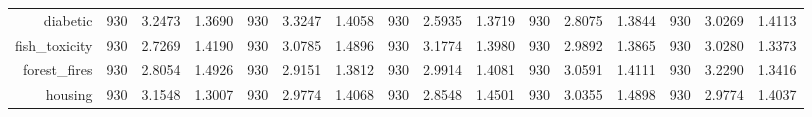 \begin{table}[htbp]
{\begin{tabular}{rccccccccccccccc}
			diabetic                            & 930                                 & 3.2473                                                                    & 1.3690          & 930                            & 3.3247                                                                             & 1.4058          & 930                             & \cellcolor[rgb]{ .776,  .937,  .808}\textcolor[rgb]{ 0,  .38,  0}{2.5935} & 1.3719          & 930                             & 2.8075                                                                    & 1.3844          & 930                             & 3.0269          & 1.4113          \\
			fish\_toxicity                      & 930                                 & \cellcolor[rgb]{ .776,  .937,  .808}\textcolor[rgb]{ 0,  .38,  0}{2.7269} & 1.4190          & 930                            & 3.0785                                                                             & 1.4896          & 930                             & 3.1774                                                                    & 1.3980          & 930                             & 2.9892                                                                    & 1.3865          & 930                             & 3.0280          & 1.3373          \\
			forest\_fires                       & 930                                 & \cellcolor[rgb]{ .776,  .937,  .808}\textcolor[rgb]{ 0,  .38,  0}{2.8054} & 1.4926          & 930                            & 2.9151                                                                             & 1.3812          & 930                             & 2.9914                                                                    & 1.4081          & 930                             & 3.0591                                                                    & 1.4111          & 930                             & 3.2290          & 1.3416          \\
			housing                             & 930                                 & 3.1548                                                                    & 1.3007          & 930                            & 2.9774                                                                             & 1.4068          & 930                             & \cellcolor[rgb]{ .776,  .937,  .808}\textcolor[rgb]{ 0,  .38,  0}{2.8548} & 1.4501          & 930                             & 3.0355                                                                    & 1.4898          & 930                             & 2.9774          & 1.4037          \\

\end{tabular}}
\end{table}
